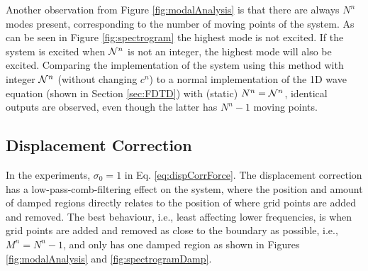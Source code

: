Another observation from Figure \ref{fig:modalAnalysis} is that there are always $N^n$ modes present, corresponding to the number of moving points of the system. As can be seen in Figure \ref{fig:spectrogram} the highest mode is not excited. If the system is excited when $\mathcal{N}^n$ is not an integer, the highest mode will also be excited.
Comparing the implementation of the system using this method with integer $\mathcal{N}^n$ (without changing $c^n$) to a normal implementation of the 1D wave equation (shown in Section \ref{sec:FDTD}) with (static) $N^n = \mathcal{N}^n$, identical outputs are observed, even though the latter has $N^n-1$ moving points.


\subsection{Displacement Correction}\label{sec:dispCorrRes}
In the experiments, $\sigma_0 = 1$ in Eq. \eqref{eq:dispCorrForce}. The displacement correction has a low-pass-comb-filtering effect on the system, where the position and amount of damped regions directly relates to the position of where grid points are added and removed. The best behaviour, i.e., least affecting lower frequencies, is when grid points are added and removed as close to the boundary as possible, i.e., $M^n = N^n - 1$, and only has one damped region as shown in Figures \ref{fig:modalAnalysis} and \ref{fig:spectrogramDamp}.



